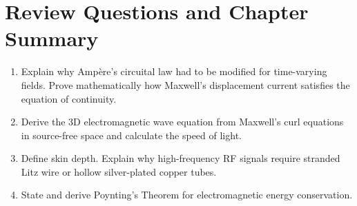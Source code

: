 \section{Review Questions and Chapter Summary}
\begin{enumerate}[leftmargin=*,itemsep=3pt]
    \item Explain why Ampère's circuital law had to be modified for time-varying fields. Prove mathematically how Maxwell's displacement current satisfies the equation of continuity.
    \item Derive the 3D electromagnetic wave equation from Maxwell's curl equations in source-free space and calculate the speed of light.
    \item Define skin depth. Explain why high-frequency RF signals require stranded Litz wire or hollow silver-plated copper tubes.
    \item State and derive Poynting's Theorem for electromagnetic energy conservation.
\end{enumerate}
